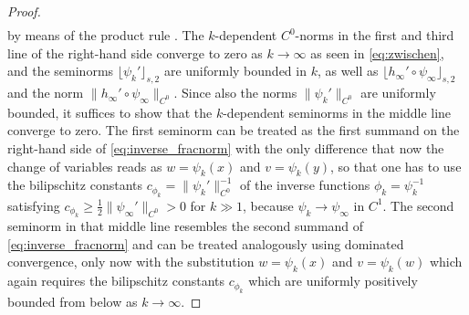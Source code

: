 \begin{proof}
\begin{align*}
\end{align*}
by means of the product rule \cite[Proposition A.5]{knappmann-etal_2023}.
The $k$-dependent $C^0$-norms in the first and third line of the right-hand side
converge to zero as $k\to\infty$
as seen in 
\cref{eq:zwischen}, and the seminorms $\lfloor\psi_k'\rfloor_{s,2}$
 are uniformly bounded in $k$, as well as
$\lfloor h_\infty'\circ\psi_\infty\rfloor_{s,2}$ and
the norm $\|h_\infty'\circ\psi_\infty\|_{C^0}$.
Since also the norms $\|\psi_k'\|_{C^0}$ are uniformly bounded, it suffices to
show that the $k$-dependent seminorms in the middle line 
converge to zero. The first
seminorm can be treated as the first summand on the right-hand side
of \cref{eq:inverse_fracnorm} with the only difference that now the change
of variables reads as $w=\psi_k(x)$ and $v=\psi_k(y)$, so that one
has to use the bilipschitz constants $c_{\phi_k}=\|\psi_k'\|_{C^0}^{-1}$
of the inverse functions $\phi_k=\psi_k^{-1}$ satisfying
$c_{\phi_k}\ge
\frac{1}{2}\|\psi_\infty'\|_{C^0}>0$ for $k\gg 1$, because $\psi_k\to\psi_\infty$ in $C^1$. 
The second seminorm in that middle line resembles the second
summand of \cref{eq:inverse_fracnorm} and can be treated analogously 
using dominated
convergence, only now with the substitution $w=\psi_k(x)$ and $v=\psi_k(w)$ which
again requires the bilipschitz constants $c_{\phi_k}$ which are uniformly
positively bounded from below as $k\to\infty$. 
	\end{proof}
